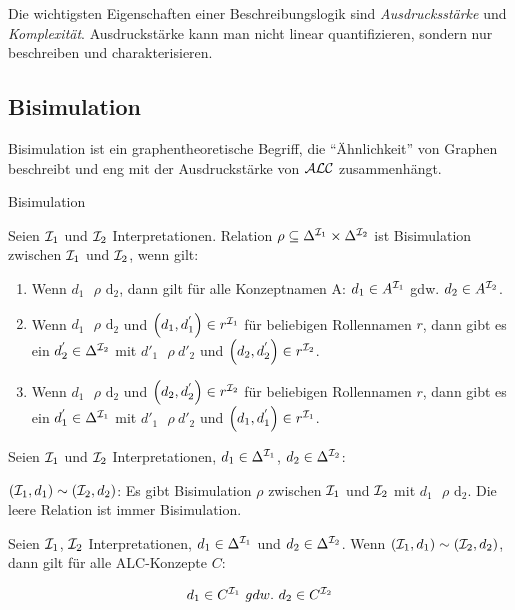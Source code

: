 Die wichtigsten Eigenschaften einer Beschreibungslogik sind
\emph{Ausdrucksstärke} und \emph{Komplexität}. Ausdruckstärke kann man
nicht linear quantifizieren, sondern nur beschreiben und
charakterisieren.

\subsection{Bisimulation}\label{bisimulation}

Bisimulation ist ein graphentheoretische Begriff, die \enquote{Ähnlichkeit} von Graphen beschreibt und eng mit der Ausdruckstärke von $\mathcal{A}\mathcal{L}\mathcal{C}$ zusammenhängt.

\begin{definition}{Bisimulation}

Seien $\mathcal{I}_{1}$ und $\mathcal{I}_{2}$ Interpretationen. Relation
$\rho \subseteq \Delta^{\mathcal{I}_{1}} \times \Delta^{\mathcal{I}_{2}}$ ist Bisimulation
zwischen $\mathcal{I}_{1}$ und $\mathcal{I}_{2}$, wenn gilt:

\begin{enumerate}
\def\labelenumi{\arabic{enumi}.}
\item
  Wenn $d_{1}\text{\ $\rho$}\text{\ d}_{2}$, dann gilt für alle
  Konzeptnamen A: $d_{1} \in A^{\mathcal{I}_{1}}$ gdw. $d_{2} \in A^{\mathcal{I}_{2}}$.
\item
  Wenn $d_{1}\text{\ $\rho$}\text{\ d}_{2}$ und
  $\left( d_{1},d_{1}^{'} \right) \in r^{\mathcal{I}_{1}}$ für beliebigen
  Rollennamen $r$, dann gibt es ein $d_{2}^{'} \in \Delta^{\mathcal{I}_{2}}$
  mit ${d'}_{1}\text{\ $\rho$}{\ d'}_{2}$ und
  $\left( d_{2},d_{2}^{'} \right) \in r^{\mathcal{I}_{2}}$.
\item
  Wenn $d_{1}\text{\ $\rho$}\text{\ d}_{2}$ und
  $\left( d_{2},d_{2}^{'} \right) \in r^{\mathcal{I}_{2}}$ für beliebigen
  Rollennamen $r$, dann gibt es ein $d_{1}^{'} \in \Delta^{\mathcal{I}_{1}}$
  mit ${d'}_{1}\text{\ $\rho$}{\ d'}_{2}$ und
  $\left( d_{1},d_{1}^{'} \right) \in r^{\mathcal{I}_{1}}$.
\end{enumerate}
\end{definition}

Seien $\mathcal{I}_{1}$ und $\mathcal{I}_{2}$ Interpretationen,
$d_{1} \in \Delta^{\mathcal{I}_{1}}$, $d_{2} \in \Delta^{\mathcal{I}_{2}}$:

$(\mathcal{I}_{1},d_{1}) \sim (\mathcal{I}_{2},d_{2})$: Es gibt Bisimulation $\rho$
zwischen $\mathcal{I}_{1}$ und $\mathcal{I}_{2}$ mit $d_{1}\text{\ $\rho$}\text{\ d}_{2}$.
Die leere Relation ist immer Bisimulation.

\begin{theorem}
Seien $\mathcal{I}_{1}$, $\mathcal{I}_{2}$ Interpretationen,
$d_{1} \in \Delta^{\mathcal{I}_{1}}$ und $d_{2} \in \Delta^{\mathcal{I}_{2}}$. Wenn
$(\mathcal{I}_{1},d_{1}) \sim (\mathcal{I}_{2},d_{2})$, dann gilt für alle ALC-Konzepte
$C$:

$$d_{1} \in C^{\mathcal{I}_{1}}\ gdw.\ d_{2} \in C^{\mathcal{I}_{2}}$$
\end{theorem}

